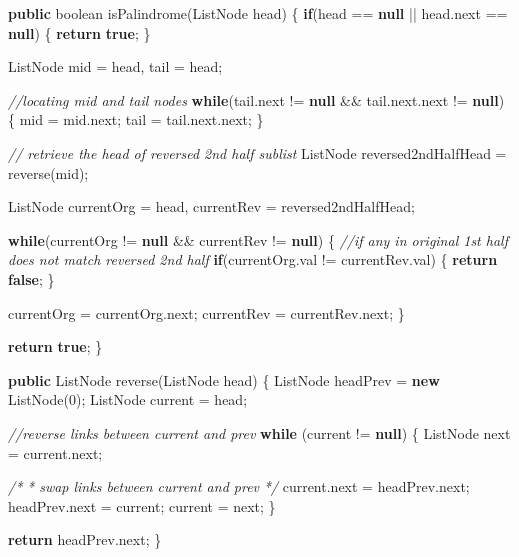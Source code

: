 \documentclass[]{book}
\newenvironment{Shaded}{\begin{snugshade}}{\end{snugshade}}
\newcommand{\CommentTok}[1]{\textcolor[rgb]{0.56,0.35,0.01}{\textit{#1}}}
\newcommand{\DataTypeTok}[1]{\textcolor[rgb]{0.13,0.29,0.53}{#1}}
\newcommand{\DecValTok}[1]{\textcolor[rgb]{0.00,0.00,0.81}{#1}}
\newcommand{\FunctionTok}[1]{\textcolor[rgb]{0.00,0.00,0.00}{#1}}
\newcommand{\KeywordTok}[1]{\textcolor[rgb]{0.13,0.29,0.53}{\textbf{#1}}}
\newcommand{\NormalTok}[1]{#1}
\begin{document}
\begin{Shaded}
\begin{Highlighting}[]
\KeywordTok{public} \DataTypeTok{boolean} \FunctionTok{isPalindrome}\NormalTok{(ListNode head) \{}
    \KeywordTok{if}\NormalTok{(head == }\KeywordTok{null}\NormalTok{ || head.}\FunctionTok{next}\NormalTok{ == }\KeywordTok{null}\NormalTok{) \{}
        \KeywordTok{return} \KeywordTok{true}\NormalTok{;}
\NormalTok{    \}}

\NormalTok{    ListNode mid = head, tail = head;}

    \CommentTok{//locating mid and tail nodes}
    \KeywordTok{while}\NormalTok{(tail.}\FunctionTok{next}\NormalTok{ != }\KeywordTok{null}\NormalTok{ && tail.}\FunctionTok{next}\NormalTok{.}\FunctionTok{next}\NormalTok{ != }\KeywordTok{null}\NormalTok{) \{}
\NormalTok{        mid = mid.}\FunctionTok{next}\NormalTok{;}
\NormalTok{        tail = tail.}\FunctionTok{next}\NormalTok{.}\FunctionTok{next}\NormalTok{;}
\NormalTok{    \}}

    \CommentTok{// retrieve the head of reversed 2nd half sublist}
\NormalTok{    ListNode reversed2ndHalfHead = }\FunctionTok{reverse}\NormalTok{(mid);}

\NormalTok{    ListNode currentOrg = head, currentRev = reversed2ndHalfHead;}

    \KeywordTok{while}\NormalTok{(currentOrg != }\KeywordTok{null}\NormalTok{ && currentRev != }\KeywordTok{null}\NormalTok{) \{}
        \CommentTok{//if any in original 1st half does not match reversed 2nd half}
        \KeywordTok{if}\NormalTok{(currentOrg.}\FunctionTok{val}\NormalTok{ != currentRev.}\FunctionTok{val}\NormalTok{) \{}
            \KeywordTok{return} \KeywordTok{false}\NormalTok{;}
\NormalTok{        \}}

\NormalTok{        currentOrg = currentOrg.}\FunctionTok{next}\NormalTok{;}
\NormalTok{        currentRev = currentRev.}\FunctionTok{next}\NormalTok{;}
\NormalTok{    \}}

    \KeywordTok{return} \KeywordTok{true}\NormalTok{;}
\NormalTok{\}}

\KeywordTok{public}\NormalTok{ ListNode }\FunctionTok{reverse}\NormalTok{(ListNode head) \{}
\NormalTok{    ListNode headPrev = }\KeywordTok{new} \FunctionTok{ListNode}\NormalTok{(}\DecValTok{0}\NormalTok{);}
\NormalTok{    ListNode current = head;}

    \CommentTok{//reverse links between current and prev}
    \KeywordTok{while}\NormalTok{ (current != }\KeywordTok{null}\NormalTok{) \{}
\NormalTok{        ListNode next = current.}\FunctionTok{next}\NormalTok{;}

        \CommentTok{/*}
\CommentTok{        * swap links between current and prev}
\CommentTok{        */}
\NormalTok{        current.}\FunctionTok{next}\NormalTok{ = headPrev.}\FunctionTok{next}\NormalTok{;}
\NormalTok{        headPrev.}\FunctionTok{next}\NormalTok{ = current;}
\NormalTok{        current = next;}
\NormalTok{    \}}

    \KeywordTok{return}\NormalTok{ headPrev.}\FunctionTok{next}\NormalTok{;}
\NormalTok{\}}
\end{Highlighting}
\end{Shaded}
\end{document}
